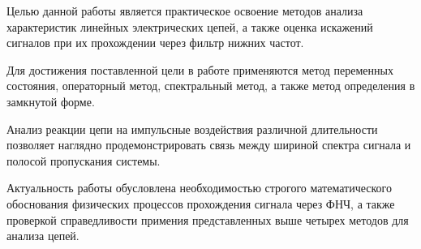 Целью данной работы является практическое освоение методов анализа характеристик линейных электрических цепей, а также оценка искажений сигналов при их прохождении через фильтр нижних частот.

Для достижения поставленной цели в работе применяются метод переменных состояния, операторный метод, спектральный метод, а также метод определения в замкнутой форме.

Анализ реакции цепи на импульсные воздействия различной длительности позволяет наглядно продемонстрировать связь между шириной спектра сигнала и полосой пропускания системы.

Актуальность работы обусловлена необходимостью строгого математического обоснования физических процессов прохождения сигнала через ФНЧ, а также проверкой справедливости примения представленных выше четырех методов для анализа цепей.
